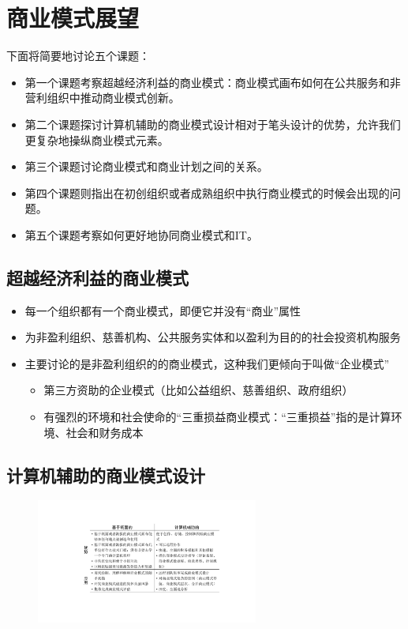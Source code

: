 \section{商业模式展望}

下面将简要地讨论五个课题：
\begin{itemize}
    \item 第一个课题考察超越经济利益的商业模式：商业模式画布如何在公共服务和非营利组织中推动商业模式创新。
    \item 第二个课题探讨计算机辅助的商业模式设计相对于笔头设计的优势，允许我们更复杂地操纵商业模式元素。
    \item 第三个课题讨论商业模式和商业计划之间的关系。
    \item 第四个课题则指出在初创组织或者成熟组织中执行商业模式的时候会出现的问题。
    \item 第五个课题考察如何更好地协同商业模式和IT。
\end{itemize}

\subsection{超越经济利益的商业模式}
\begin{itemize}
    \item 每一个组织都有一个商业模式，即便它并没有“商业”属性
    \item 为非盈利组织、慈善机构、公共服务实体和以盈利为目的的社会投资机构服务
    \item 主要讨论的是非盈利组织的的商业模式，这种我们更倾向于叫做“企业模式”
    \begin{itemize}
        \item 第三方资助的企业模式（比如公益组织、慈善组织、政府组织）
        \item 有强烈的环境和社会使命的“三重损益商业模式：“三重损益”指的是计算环境、社会和财务成本
    \end{itemize}
\end{itemize}


\subsection{计算机辅助的商业模式设计}
\begin{figure}[H]
	\centering
	\vspace{-0.5em}
	\includegraphics[width=0.65\textwidth]{img/计算机辅助的商业模式设计.pdf}
	\vspace{-0.5em}
\end{figure}

